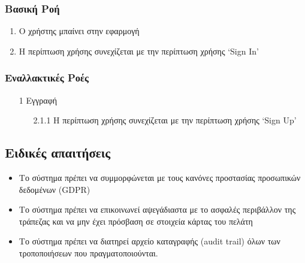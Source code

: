 \documentclass[12pt,a4paper,twoside]{book}
\begin{document}
\subsubsection{Βασική Ροή}
\begin{enumerate}
  \item Ο χρήστης μπαίνει στην εφαρμογή
  \item Η περίπτωση χρήσης συνεχίζεται με την περίπτωση χρήσης `Sign In' %
\end{enumerate}

\subsubsection{Εναλλακτικές Ροές}
\begin{enumerate}
  \item[1 ] Εγγραφή %
        \begin{enumerate}
          \item[2.1.1 ] Η περίπτωση χρήσης συνεχίζεται με την περίπτωση χρήσης `Sign Up' %
        \end{enumerate}
\end{enumerate}

\subsection{Ειδικές απαιτήσεις} %
\begin{itemize}
  \item Το σύστημα πρέπει να συμμορφώνεται με τους κανόνες προστασίας προσωπικών δεδομένων (GDPR)  %
  \item Το σύστημα πρέπει να επικοινωνεί αψεγάδιαστα με το ασφαλές περιβάλλον της τράπεζας και να μην έχει πρόσβαση σε στοιχεία κάρτας του πελάτη   %
  \item Το σύστημα πρέπει να διατηρεί αρχείο καταγραφής (audit trail) όλων των τροποποιήσεων που πραγματοποιούνται. %
\end{itemize}
\end{document}
